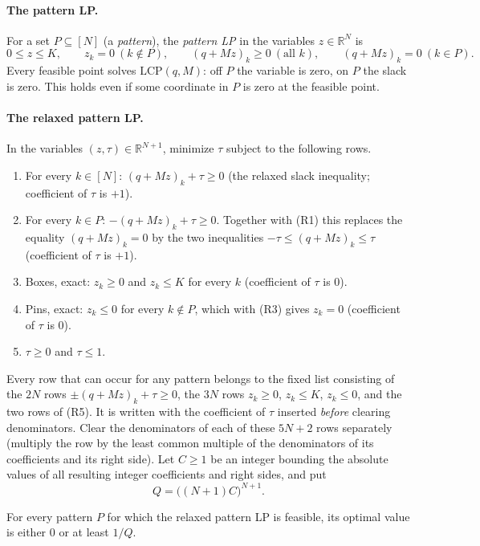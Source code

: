 \paragraph{The pattern LP.} For a set $P\subseteq[N]$ (a \emph{pattern}), the \emph{pattern LP} in the
variables $z\in\mathbb R^N$ is
\[
  0\le z\le K,\qquad z_k=0\ (k\notin P),\qquad (q+Mz)_k\ge0\ (\text{all }k),\qquad (q+Mz)_k=0\ (k\in P).
\]
Every feasible point solves $\mathrm{LCP}(q,M)$: off $P$ the variable is zero, on $P$ the slack is zero.
This holds even if some coordinate in $P$ is zero at the feasible point.

\paragraph{The relaxed pattern LP.} In the variables $(z,\tau)\in\mathbb R^{N+1}$, minimize $\tau$ subject
to the following rows.
\begin{enumerate}[label=(R\arabic*),nosep]
  \item For every $k\in[N]$: $(q+Mz)_k+\tau\ge0$ (the relaxed slack inequality; coefficient of $\tau$
        is $+1$).
  \item For every $k\in P$: $-(q+Mz)_k+\tau\ge0$. Together with (R1) this replaces the equality
        $(q+Mz)_k=0$ by the two inequalities $-\tau\le(q+Mz)_k\le\tau$ (coefficient of $\tau$ is $+1$).
  \item Boxes, exact: $z_k\ge0$ and $z_k\le K$ for every $k$ (coefficient of $\tau$ is $0$).
  \item Pins, exact: $z_k\le0$ for every $k\notin P$, which with (R3) gives $z_k=0$ (coefficient of
        $\tau$ is $0$).
  \item $\tau\ge0$ and $\tau\le1$.
\end{enumerate}
Every row that can occur for any pattern belongs to the fixed list consisting of the $2N$ rows
$\pm(q+Mz)_k+\tau\ge0$, the $3N$ rows $z_k\ge0$, $z_k\le K$, $z_k\le0$, and the two rows of (R5). It is
written with the coefficient of $\tau$ inserted \emph{before} clearing denominators. Clear the
denominators of each of these $5N+2$ rows separately (multiply the row by the least common multiple of
the denominators of its coefficients and its right side). Let $C\ge1$ be an integer bounding the absolute
values of all resulting integer coefficients and right sides, and put
\[
  Q=\bigl((N+1)C\bigr)^{N+1} .
\]

\begin{lemma}[Gap]\label{app-dl:lem:gap}
\statuslean
For every pattern $P$ for which the relaxed pattern LP is feasible, its optimal value is either $0$ or at
least $1/Q$.
\end{lemma}


